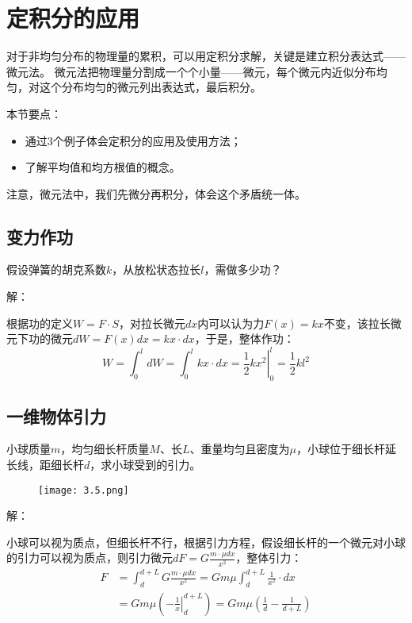\section{定积分的应用}

对于非均匀分布的物理量的累积，可以用定积分求解，关键是建立积分表达式——微元法。
微元法把物理量分割成一个个小量——微元，每个微元内近似分布均匀，对这个分布均匀的微元列出表达式，最后积分。

本节要点：
\begin{itemize}
    \item 通过3个例子体会定积分的应用及使用方法；
    \item 了解平均值和均方根值的概念。
\end{itemize}

\begin{tcolorbox}
注意，微元法中，我们先微分再积分，体会这个矛盾统一体。
\end{tcolorbox}

\subsection{变力作功}

\begin{example}
假设弹簧的胡克系数$k$，从放松状态拉长$l$，需做多少功？
\end{example}

解：

根据功的定义$W=F\cdot S$，对拉长微元$dx$内可以认为力$F\left( x \right) =kx$不变，该拉长微元下功的微元$dW=F\left( x \right) dx=kx\cdot dx$，于是，整体作功：
\[
W=\int_0^l{dW}=\int_0^l{kx\cdot dx}=\left. \frac{1}{2}kx^2 \right|_{0}^{l}=\frac{1}{2}kl^2
\]

\subsection{一维物体引力}

\begin{example}
小球质量$m$，均匀细长杆质量$M$、长$L$、重量均匀且密度为$\mu $，小球位于细长杆延长线，距细长杆$d$，求小球受到的引力。
\begin{figure}[h]
\centering
\texttt{[image: 3.5.png]}
\end{figure}
\end{example}

解：

小球可以视为质点，但细长杆不行，根据引力方程，假设细长杆的一个微元对小球的引力可以视为质点，则引力微元$dF=G\frac{m\cdot \mu dx}{x^2}$，整体引力：
\begin{align*}
F&=\int_d^{d+L}{G\frac{m\cdot \mu dx}{x^2}}=Gm\mu \int_d^{d+L}{\frac{1}{x^2}\cdot dx} \\
&=Gm\mu \left( \left. -\frac{1}{x} \right|_{d}^{d+L} \right) =Gm\mu \left( \frac{1}{d}-\frac{1}{d+L} \right)
\end{align*}


